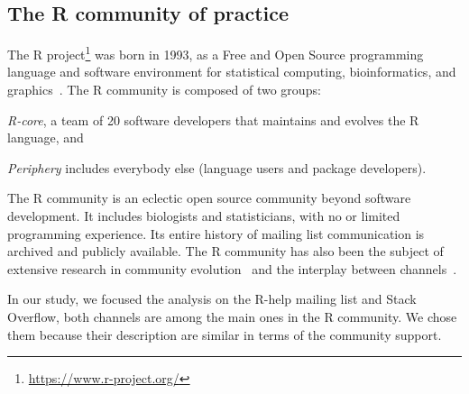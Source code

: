 
\subsection{The R community of practice}

The R project\footnote{\url{https://www.r-project.org/}} was born in 1993, as a Free and Open Source programming language and software environment for statistical computing, bioinformatics, and graphics~\cite{Ihaka1996}.
The R community is composed of two groups:
\begin{enumerate*}[label=(\arabic*)]
  \item \textit{R-core}, a team of 20 software developers that maintains and evolves the R language, and
  \item \textit{Periphery} includes everybody else (language users and package developers).
\end{enumerate*}

    The R community is an eclectic open source community beyond software development.
    It includes biologists and statisticians, with no or limited programming experience.
    Its entire history of mailing list communication is archived and publicly available.
    The R community has also been the subject of extensive research in community evolution~\cite{German2013} and the interplay between channels~\cite{Vasilescu2014c}.

    In our study, we focused the analysis on the R-help mailing list and Stack Overflow, both channels are among the main ones in the R community.
    We chose them because their description are similar in terms of the community support.

